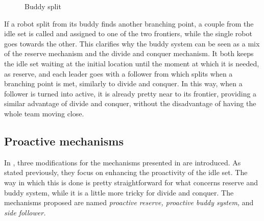 \begin{figure}[t]
\quad{}

\quad{}\caption{Buddy split}
\end{figure}

If a robot split from its buddy finds another branching point, a couple
from the idle set is called and assigned to one of the two frontiers,
while the single robot goes towards the other. This clarifies why
the buddy system can be seen as a mix of the reserve mechanism and
the divide and conquer mechanism. It both keeps the idle set waiting
at the initial location until the moment at which it is needed, as
reserve, and each leader goes with a follower from which splits when
a branching point is met, similarly to divide and conquer. In this
way, when a follower is turned into active, it is already pretty near
to its frontier, providing a similar advantage of divide and conquer,
without the disadvantage of having the whole team moving close. 

\subsection{Proactive mechanisms}

In \cite{Cattaneo2017}, three modifications for the mechanisms presented
in \cite{Rogers2013} are introduced. As stated previously, they focus on
enhancing the proactivity of the idle set. The way in which this is
done is pretty straightforward for what concerns reserve and buddy
system, while it is a little more tricky for divide and conquer. The
mechanisms proposed are named \emph{proactive reserve, proactive buddy
system, }and \emph{side follower. }

